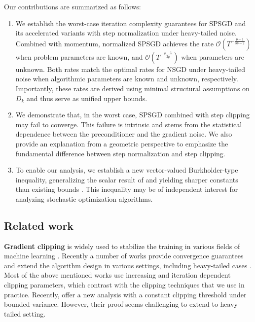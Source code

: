 \documentclass{article}
\theoremstyle{plain}
\theoremstyle{definition}
\theoremstyle{remark}
\begin{document}
Our contributions are summarized as follows:
\begin{enumerate}

\item We establish the worst-case iteration complexity guarantees for SPSGD and its accelerated variants with step normalization under heavy-tailed noise. Combined with momentum, normalized SPSGD achieves the rate $\mathcal{O}(T^{-\frac{p-1}{3p-2}})$ when problem parameters are known, and $\mathcal{O}(T^{-\frac{p-1}{2p}})$ when parameters are unknown. Both rates match the optimal rates for NSGD under heavy-tailed noise when algorithmic parameters are known and unknown, respectively. Importantly, these rates are derived using minimal structural assumptions on $D_k$ and thus serve as unified upper bounds. %

\item We demonstrate that, in the worst case, SPSGD combined with step clipping may fail to converge. This failure is intrinsic and stems from the statistical dependence between the preconditioner and the gradient noise. We also provide an explanation from a geometric perspective to emphasize the fundamental difference between step normalization and step clipping.

\item To enable our analysis, we establish a new vector-valued Burkholder-type inequality, generalizing the scalar result of \citep{Fang2025High} and yielding sharper constants than existing bounds \citep{Hubler2024Gradient}. This inequality may be of independent interest for analyzing stochastic optimization algorithms.
\end{enumerate}






\subsection{Related work}

\noindent\textbf{Gradient clipping} is widely used to stabilize the
training in various fields of machine learning \citep{Pascanu2013Difficulty,Schulman2017Proximal,Zhang2020Adaptive}. Recently a number of works provide convergence guarantees and extend the algorithm design in various settings, including heavy-tailed cases \citep{Nazin2019Algorithms,Gorbunov2020Stochastic,Gorbunov2024Methods,Puchkin2024Breaking,Sadiev2023High,nguyen2023improved}. Most of the above mentioned works use increasing and iteration dependent clipping parameters, which contrast with the clipping techniques that we use in practice. Recently, \citet{koloskova2023revisiting} offer
a new analysis with a constant clipping
threshold under bounded-variance. However, their proof seems challenging to extend to heavy-tailed setting. 
\end{document}
